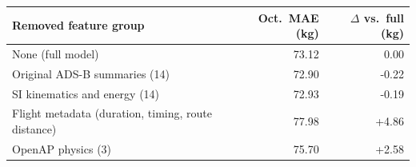 \begin{tabular}{lrr}
\toprule
Removed feature group & Oct.\ MAE (kg) & $\Delta$ vs.\ full (kg) \\
\midrule
None (full model) & 73.12 & 0.00 \\
Original ADS-B summaries (14) & 72.90 & -0.22 \\
SI kinematics and energy (14) & 72.93 & -0.19 \\
Flight metadata (duration, timing, route distance) & 77.98 & +4.86 \\
OpenAP physics (3) & 75.70 & +2.58 \\
\bottomrule
\end{tabular}
